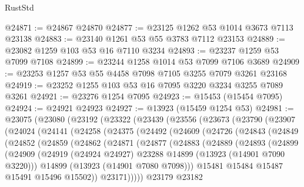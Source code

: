 \begin{lexlean}{RustStd}
\begin{coremodule}
@24871 := @24867 @24870
@24877 := @23125 @1262 @53 @1014 @3673 @7113 @23138
@24883 := @23140 @1261 @53 @55 @3783 @7112 @23153
@24889 := @23082 @1259 @103 @53 @16 @7110 @3234
@24893 := @23237 @1259 @53 @7099 @7108
@24899 := @23244 @1258 @1014 @53 @7099 @7106 @3689
@24909 := @23253 @1257 @53 @55 @4458 @7098 @7105 @3255 @7079 @3261 @23168
@24919 := @23252 @1255 @103 @53 @16 @7095 @3220 @3234 @3255 @7089 @3261
@24921 := @23276 @1254 @7095
@24923 := @15453 (@15454 @7095)
@24924 := @24921 @24923
@24927 := @13923 (@15459 @1254 @53)
@24981 := @23075
    (@23080
      (@23192
        (@23322
          (@23439
            (@23556
              (@23673
                (@23790
                  (@23907
                    (@24024
                      (@24141
                        (@24258
                          (@24375
                            (@24492
                              (@24609
                                (@24726
                                  (@24843
                                    (@24849
                                      (@24852
                                        (@24859
                                          (@24862
                                            (@24871
                                              (@24877
                                                (@24883
                                                  (@24889
                                                    (@24893
                                                      (@24899
                                                        (@24909
                                                          (@24919
                                                            (@24924 @24927)
                                                            @23288
                                                            @14899
                                                            (@13923 (@14901 @7090 @3220)))
                                                          @14899
                                                          (@13923 (@14901 @7080 @7098)))
                                                        @15481
                                                        @15484
                                                        @15487
                                                        @15491
                                                        @15496
                                                        @15502))
                                                    @23171)))))
                                          @23179
                                          @23182

\end{coremodule}
\end{lexlean}
